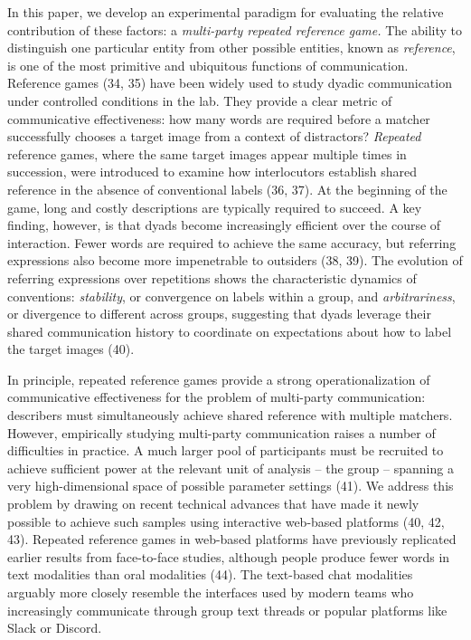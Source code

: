 \documentclass[9pt,twocolumn,twoside]{pnas-new}
\begin{document}
In this paper, we develop an experimental paradigm for evaluating the
relative contribution of these factors: a \emph{multi-party repeated
reference game.} The ability to distinguish one particular entity from
other possible entities, known as \emph{reference}, is one of the most
primitive and ubiquitous functions of communication. Reference games
(34, 35) have been widely used to study dyadic communication under
controlled conditions in the lab. They provide a clear metric of
communicative effectiveness: how many words are required before a
matcher successfully chooses a target image from a context of
distractors? \emph{Repeated} reference games, where the same target
images appear multiple times in succession, were introduced to examine
how interlocutors establish shared reference in the absence of
conventional labels (36, 37). At the beginning of the game, long and
costly descriptions are typically required to succeed. A key finding,
however, is that dyads become increasingly efficient over the course of
interaction. Fewer words are required to achieve the same accuracy, but
referring expressions also become more impenetrable to outsiders (38,
39). The evolution of referring expressions over repetitions shows the
characteristic dynamics of conventions: \emph{stability}, or convergence
on labels within a group, and \emph{arbitrariness}, or divergence to
different across groups, suggesting that dyads leverage their shared
communication history to coordinate on expectations about how to label
the target images (40).

In principle, repeated reference games provide a strong
operationalization of communicative effectiveness for the problem of
multi-party communication: describers must simultaneously achieve shared
reference with multiple matchers. However, empirically studying
multi-party communication raises a number of difficulties in practice. A
much larger pool of participants must be recruited to achieve sufficient
power at the relevant unit of analysis -- the group -- spanning a very
high-dimensional space of possible parameter settings (41). We address
this problem by drawing on recent technical advances that have made it
newly possible to achieve such samples using interactive web-based
platforms (40, 42, 43). Repeated reference games in web-based platforms
have previously replicated earlier results from face-to-face studies,
although people produce fewer words in text modalities than oral
modalities (44). The text-based chat modalities arguably more closely
resemble the interfaces used by modern teams who increasingly
communicate through group text threads or popular platforms like Slack
or Discord.
\end{document}
